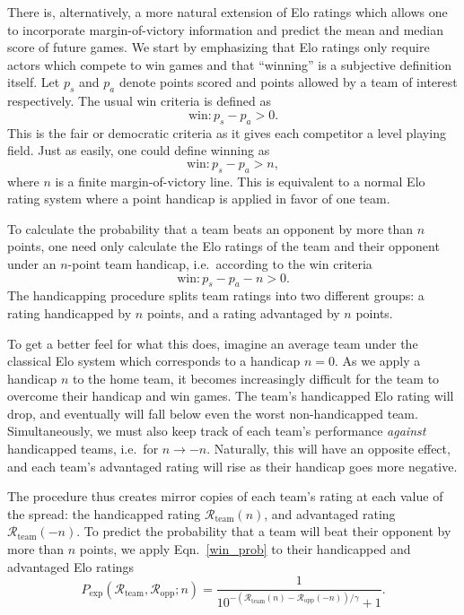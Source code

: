 \documentclass[aps,prc,reprint,amsmath,superscriptaddress]{revtex4-1}
\newcommand{\R}{\mathcal{R}}
\begin{document}
There is, alternatively, a more natural extension of Elo ratings which allows one to incorporate margin-of-victory information and predict the mean and median score of future games.
We start by emphasizing that Elo ratings only require actors which compete to win games and that ``winning'' is a subjective definition itself.
Let $p_s$ and $p_a$ denote points scored and points allowed by a team of interest respectively.
The usual win criteria is defined as
\begin{equation}
  \text{win}: p_s - p_a > 0.
\end{equation}
This is the fair or democratic criteria as it gives each competitor a level playing field.
Just as easily, one could define winning as
\begin{equation}
  \text{win}: p_s - p_a > n,
\end{equation}
where $n$ is a finite margin-of-victory line.
This is equivalent to a normal Elo rating system where a point handicap is applied in favor of one team.

To calculate the probability that a team beats an opponent by more than $n$ points, one need only calculate the Elo ratings of the team and their opponent under an $n$-point team handicap, i.e.\ according to the win criteria
\begin{equation}
  \text{win}: p_s - p_a - n > 0.
\end{equation}
The handicapping procedure splits team ratings into two different groups: a rating handicapped by $n$ points, and a rating advantaged by $n$ points.

To get a better feel for what this does, imagine an average team under the classical Elo system which corresponds to a handicap $n=0$. 
As we apply a handicap $n$ to the home team, it becomes increasingly difficult for the team to overcome their handicap and win games.
The team's handicapped Elo rating will drop, and eventually will fall below even the worst non-handicapped team.
Simultaneously, we must also keep track of each team's performance \emph{against} handicapped teams, i.e.\ for $n \rightarrow -n$.
Naturally, this will have an opposite effect, and each team's advantaged rating will rise as their handicap goes more negative.

The procedure thus creates mirror copies of each team's rating at each value of the spread: the handicapped rating $\R_\text{team}(n)$, and advantaged rating $\R_\text{team}(-n)$.
To predict the probability that a team will beat their opponent by more than $n$ points, we apply Eqn.~\eqref{win_prob} to their handicapped and advantaged Elo ratings
\begin{equation}
  \label{win_prob_hcap}
  P_\text{exp}(\R_\text{team}, \R_\text{opp}; n) = \frac{1}{10^{-(\R_\text{team}(n) - \R_\text{opp}(-n))/\gamma} + 1}.
\end{equation}
\end{document}

